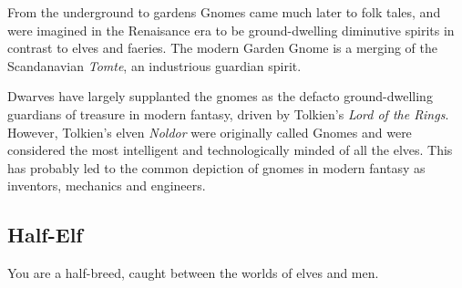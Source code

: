 \documentclass[10pt,twoside]{article}
\begin{document}
\begin{multicols}{2}
\begin{commentbox}{From the underground to gardens}
Gnomes came much later to folk tales, and were imagined in the Renaisance era to be ground-dwelling diminutive spirits in contrast to elves and faeries. The modern Garden Gnome is a merging of the Scandanavian \textit{Tomte}, an industrious guardian spirit.

Dwarves have largely supplanted the gnomes as the defacto ground-dwelling guardians of treasure in modern fantasy, driven by Tolkien's \textit{Lord of the Rings}. However, Tolkien's elven \textit{Noldor} were originally called Gnomes and were considered the most intelligent and technologically minded of all the elves. This has probably led to the common depiction of gnomes in modern fantasy as inventors, mechanics and engineers.

\end{commentbox}


\end{multicols}

\newpage


\subsection{Half-Elf}

You are a half-breed, caught between the worlds of elves and men.
\end{document}
